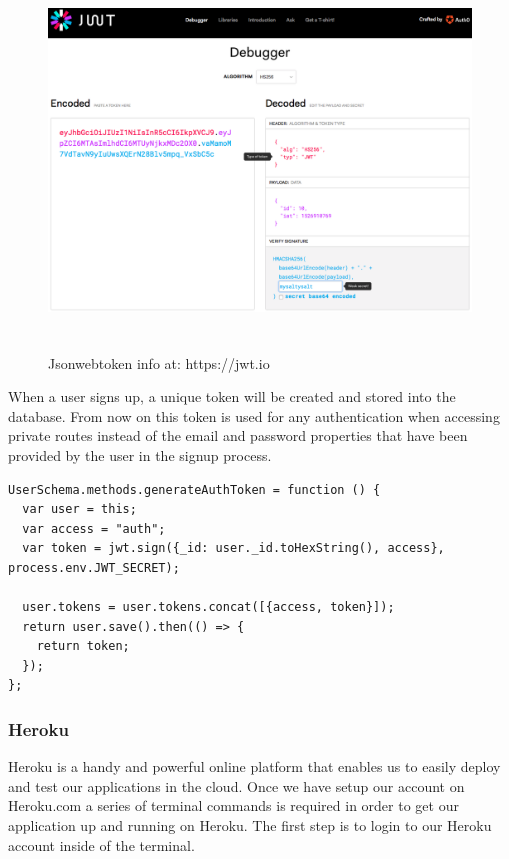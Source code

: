 	\begin{figure}[H] 
		\centering 
		\includegraphics[height=10cm]{figures/jwt}    
		\caption[Jsonwebtoken info at: https://jwt.io]{Jsonwebtoken info at: https://jwt.io}     
		\label{fig: Jsonwebtoken info at: https://jwt.io}      
	\end{figure}    

 


When a user signs up, a unique token will be created and stored into the database. From now on this token is used for any authentication when accessing private routes instead of the email and password properties that have been provided by the user in the signup process. 

\begin{lstlisting}
UserSchema.methods.generateAuthToken = function () {
  var user = this; 
  var access = "auth";
  var token = jwt.sign({_id: user._id.toHexString(), access}, process.env.JWT_SECRET);

  user.tokens = user.tokens.concat([{access, token}]);
  return user.save().then(() => {
    return token;
  });
};

\end{lstlisting}




\subsubsection{Heroku}
Heroku is a handy and powerful online platform that enables us to easily deploy and test our applications in the cloud. Once we have setup our account on Heroku.com a series of terminal commands is required in order to get our application up and running on Heroku. The first step is to login to our Heroku account inside of the terminal. 


